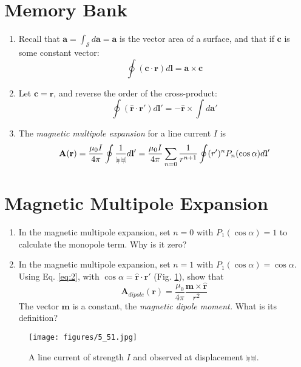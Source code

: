 \documentclass[12pt]{article}
\def\rcurs{{\mbox{$\resizebox{.16in}{.08in}{\texttt{[image: ScriptR]}}$}}}
\begin{document}
\maketitle
\small
\section{Memory Bank}
\begin{enumerate}
\item Recall that $\mathbf{a} = \int_{\mathcal{S}} d\mathbf{a} = \mathbf{a}$ is the vector area of a surface, and that if $\mathbf{c}$ is some constant vector:
\begin{equation}
\oint (\mathbf{c} \cdot \mathbf{r}) d\mathbf{l} = \mathbf{a} \times \mathbf{c} \label{eq:1}
\end{equation}
\item Let $\mathbf{c} = \hat{\mathbf{r}}$, and reverse the order of the cross-product:
\begin{equation}
\oint (\hat{\mathbf{r}} \cdot \mathbf{r}') d\mathbf{l}' = -\hat{\mathbf{r}} \times \int d\mathbf{a}' \label{eq:2}
\end{equation}
\item The \textit{magnetic multipole expansion} for a line current $I$ is
\begin{equation}
\mathbf{A}(\mathbf{r}) = \frac{\mu_0 I}{4\pi} \oint \frac{1}{\rcurs}d\mathbf{l}' = \frac{\mu_0 I}{4\pi} \sum_{n=0} \frac{1}{r^{n+1}} \oint (r')^n P_n (\cos\alpha) d\mathbf{l}'
\end{equation}
\end{enumerate}

\section{Magnetic Multipole Expansion}

\begin{enumerate}
\item In the magnetic multipole expansion, set $n=0$ with $P_1(\cos\alpha) = 1$ to calculate the monopole term. Why is it zero? \\ \vspace{1cm}
\item In the magnetic multipole expansion, set $n=1$ with $P_1(\cos\alpha) = \cos\alpha$.  Using Eq. \ref{eq:2}, with $\cos\alpha = \hat{\mathbf{r}} \cdot \mathbf{r}'$ (Fig. \ref{fig:1}), show that 
\begin{equation}
\mathbf{A}_{dipole}(\mathbf{r}) = \frac{\mu_0}{4\pi}\frac{\mathbf{m} \times \hat{\mathbf{r}}}{r^2}
\end{equation}
The vector $\mathbf{m}$ is a constant, the \textit{magnetic dipole moment.} What is its definition?
\end{enumerate}

\begin{figure}
\centering
\texttt{[image: figures/5\_51.jpg]}
\caption{\label{fig:1} A line current of strength $I$ and observed at displacement $\rcurs$.}
\end{figure}
\end{document}
